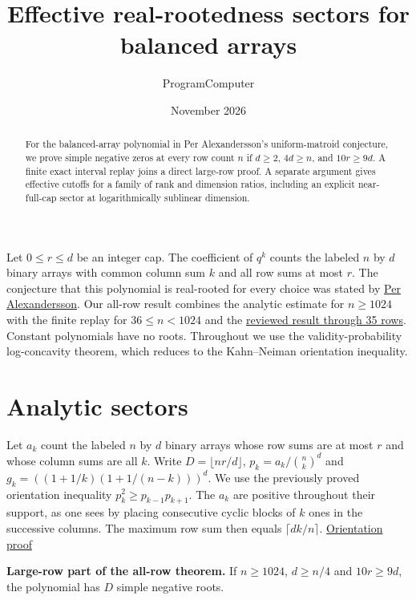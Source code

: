\documentclass[11pt]{article}
\title{Effective real-rootedness sectors for balanced arrays}
\author{ProgramComputer}
\date{November 2026}
\begin{document}
\maketitle
\begin{abstract}
For the balanced-array polynomial in Per Alexandersson's uniform-matroid
conjecture, we prove simple negative zeros at every row count $n$ if
$d\ge2$, $4d\ge n$, and $10r\ge9d$. A finite exact interval replay
joins a direct large-row proof. A separate argument gives effective
cutoffs for a family of rank and dimension ratios, including an explicit
near-full-cap sector at logarithmically sublinear dimension.
\end{abstract}

Let $0\le r\le d$ be an integer cap. The coefficient of $q^k$ counts the
labeled $n$ by $d$ binary arrays with common column sum $k$ and all row sums
at most $r$. The conjecture that this polynomial is real-rooted for every
choice was stated by
\href{https://www.symmetricfunctions.com/realRootedOpenProblems.htm\#conjBalancedArrays}{Per Alexandersson}.
Our all-row result combines the analytic estimate for $n\ge1024$ with
the finite replay for $36\le n<1024$ and the
\href{https://github.com/ProgramComputer/open-math-research/blob/4f011fab7ca16608d1472edc462a99d97a78dd78/topics/balanced-arrays/finite-residual/README.md}{reviewed result through 35 rows}.
Constant polynomials have no roots. Throughout we use the
validity-probability log-concavity theorem, which reduces to the
Kahn--Neiman orientation inequality.
\section{Analytic sectors}\label{sec:analytic}

Let $a_k$ count the labeled $n$ by $d$ binary arrays whose row sums are at most $r$ and whose column sums are all $k$. Write $D=\lfloor nr/d\rfloor$, $p_k=a_k/\binom nk^d$ and $g_k=((1+1/k)(1+1/(n-k)))^d$. We use the previously proved orientation inequality $p_k^2\ge p_{k-1}p_{k+1}$. The $a_k$ are positive throughout their support, as one sees by placing consecutive cyclic blocks of $k$ ones in the successive columns. The maximum row sum then equals $\lceil dk/n\rceil$. \href{https://github.com/ProgramComputer/open-math-research/blob/ccd2cd0eaaf9555d680ea405a5cc013176fcd7e2/topics/balanced-arrays/orientation-normalization.md}{Orientation proof}

\textbf{Large-row part of the all-row theorem.} If $n\ge1024$, $d\ge n/4$ and $10r\ge9d$, the polynomial has $D$ simple negative roots.
\end{document}
